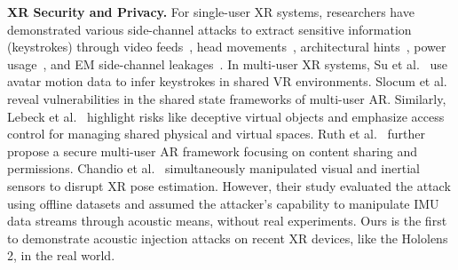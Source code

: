 
\textbf{XR Security and Privacy.} 
For single-user XR systems, researchers have demonstrated various side-channel attacks to extract sensitive information (\eg keystrokes) through video feeds~\cite{ling2019know}, head movements~\cite{nair2023unique, slocum2023going}, architectural hints~\cite{zhang2023its,shang2020arspy}, power usage~\cite{li2024dangers}, and EM side-channel leakages~\cite{al2021vr}. In multi-user XR systems, Su et al.~\cite{su2024remote} use avatar motion data to infer keystrokes in shared VR environments. Slocum et al.~\cite{slocum2024doesn} reveal vulnerabilities in the shared state frameworks of multi-user AR. Similarly, Lebeck et al.~\cite{lebeck2017securing} highlight risks like deceptive virtual objects and emphasize access control for managing shared physical and virtual spaces. Ruth et al.~\cite{ruth2019secure} further propose a secure multi-user AR framework focusing on content sharing and permissions.
Chandio et al.~\cite{chandio2024stealthy} %
simultaneously manipulated visual and inertial sensors to disrupt XR pose estimation. However, their study evaluated the attack using offline datasets and assumed the attacker's capability to manipulate IMU data streams through acoustic means, without real experiments. Ours is the first to demonstrate acoustic injection attacks on recent XR devices, like the Hololens 2, in the real world.
 

